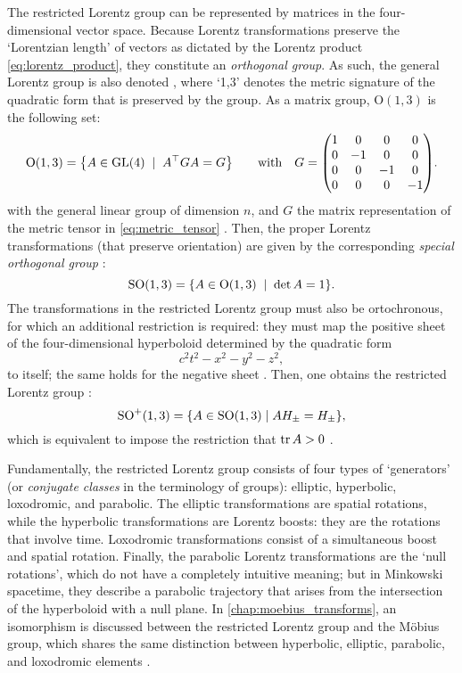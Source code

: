 The restricted Lorentz group can be represented by matrices in the four-dimensional vector space. Because Lorentz transformations preserve the `Lorentzian length' of vectors as dictated by the Lorentz product \cref{eq:lorentz_product}, they constitute an \emph{orthogonal group}. As such, the general Lorentz group is also denoted , where `1,3' denotes the metric signature of the quadratic form that is preserved by the group. As a matrix group, $\text{O}(1,3)$ is the following set:
$$ 
    \text{O}(1, 3) = \qty{A \in \text{GL}(4)\;\mid\;A^\top G A = G} \qquad \text{with}\quad G = \mqty(\dmat[0]{1,-1,-1,-1}). 
$$
with  the general linear group of dimension $n$, and $G$ the matrix representation of the metric tensor in \cref{eq:metric_tensor} \cite{Baker1967}. Then, the proper Lorentz transformations (that preserve orientation) are given by the corresponding \emph{special orthogonal group} :
$$ \text{SO}(1, 3) = \qty{A \in \text{O}(1, 3)\;\mid\;\det A = 1}.$$
The transformations in the restricted Lorentz group must also be ortochronous, for which an additional restriction is required: they must map the positive sheet  of the four-dimensional hyperboloid determined by the quadratic form 
$$ c^2t^2 - x^2 - y^2 - z^2, $$
to itself; the same holds for the negative sheet . Then, one obtains the restricted Lorentz group :
$$ \text{SO}^+(1, 3) = \qty{A \in \text{SO}(1, 3) \mid AH_{\pm} = H_{\pm}}, $$
which is equivalent to impose the restriction that $\trace A > 0$ \cite{Balazs1986, Baker1967}.

Fundamentally, the restricted Lorentz group consists of four types of `generators' (or \emph{conjugate classes} in the terminology of groups): elliptic, hyperbolic, loxodromic, and parabolic. The elliptic transformations are spatial rotations, while the hyperbolic transformations are Lorentz boosts: they are the rotations that involve time. Loxodromic transformations consist of a simultaneous boost and spatial rotation. Finally, the parabolic Lorentz transformations are the `null rotations', which do not have a completely intuitive meaning; but in Minkowski spacetime, they describe a parabolic trajectory that arises from the intersection of the hyperboloid with a null plane. In \cref{chap:moebius_transforms}, an isomorphism is discussed between the restricted Lorentz group and the Möbius group, which shares the same distinction between hyperbolic, elliptic, parabolic, and loxodromic elements \cite{Needham2021}.

